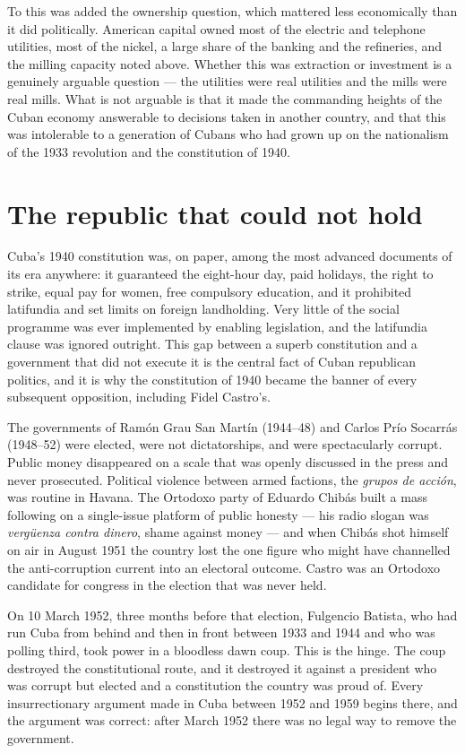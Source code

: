 To this was added the ownership question, which mattered less economically than
it did politically. American capital owned most of the electric and telephone
utilities, most of the nickel, a large share of the banking and the refineries,
and the milling capacity noted above. Whether this was extraction or investment
is a genuinely arguable question --- the utilities were real utilities and the
mills were real mills. What is not arguable is that it made the commanding
heights of the Cuban economy answerable to decisions taken in another country,
and that this was intolerable to a generation of Cubans who had grown up on the
nationalism of the 1933 revolution and the constitution of 1940.

\section{The republic that could not hold}

Cuba's 1940 constitution was, on paper, among the most advanced documents of
its era anywhere: it guaranteed the eight-hour day, paid holidays, the right to
strike, equal pay for women, free compulsory education, and it prohibited
latifundia and set limits on foreign landholding. Very little of the social
programme was ever implemented by enabling legislation, and the latifundia
clause was ignored outright. This gap between a superb constitution and a
government that did not execute it is the central fact of Cuban republican
politics, and it is why the constitution of 1940 became the banner of every
subsequent opposition, including Fidel Castro's.

The governments of Ram\'on Grau San Mart\'in (1944--48) and Carlos Pr\'io
Socarr\'as (1948--52) were elected, were not dictatorships, and were
spectacularly corrupt. Public money disappeared on a scale that was openly
discussed in the press and never prosecuted. Political violence between armed
factions, the \emph{grupos de acci\'on}, was routine in Havana. The Ortodoxo
party of Eduardo Chib\'as built a mass following on a single-issue platform of
public honesty --- his radio slogan was \emph{verg\"uenza contra dinero},
shame against money --- and when Chib\'as shot himself on air in August 1951 the
country lost the one figure who might have channelled the anti-corruption
current into an electoral outcome. Castro was an Ortodoxo candidate for
congress in the election that was never held.

On 10 March 1952, three months before that election, Fulgencio Batista, who had
run Cuba from behind and then in front between 1933 and 1944 and who was
polling third, took power in a bloodless dawn coup. This is the hinge. The coup
destroyed the constitutional route, and it destroyed it against a president who
was corrupt but elected and a constitution the country was proud of. Every
insurrectionary argument made in Cuba between 1952 and 1959 begins there, and
the argument was correct: after March 1952 there was no legal way to remove the
government.

